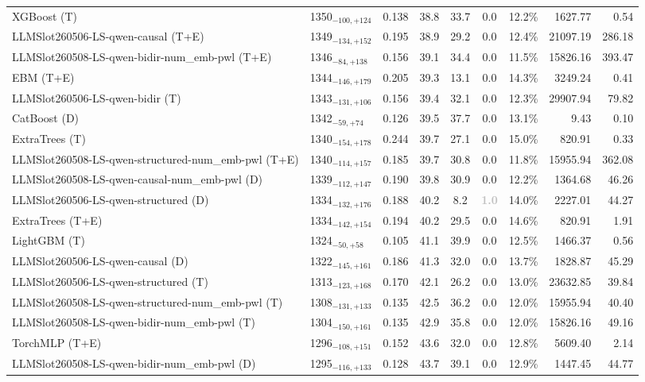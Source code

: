\begin{tabular}{llcccccrr}
XGBoost (T) & 1350${}_{-100,+124}$ & 0.138 & 38.8 & 33.7 & 0.0 & 12.2\% & 1627.77 & 0.54 \\
LLMSlot260506-LS-qwen-causal (T+E) & 1349${}_{-134,+152}$ & 0.195 & 38.9 & 29.2 & 0.0 & 12.4\% & 21097.19 & 286.18 \\
LLMSlot260508-LS-qwen-bidir-num_emb-pwl (T+E) & 1346${}_{-84,+138}$ & 0.156 & 39.1 & 34.4 & 0.0 & 11.5\% & 15826.16 & 393.47 \\
EBM (T+E) & 1344${}_{-146,+179}$ & 0.205 & 39.3 & 13.1 & 0.0 & 14.3\% & 3249.24 & 0.41 \\
LLMSlot260506-LS-qwen-bidir (T) & 1343${}_{-131,+106}$ & 0.156 & 39.4 & 32.1 & 0.0 & 12.3\% & 29907.94 & 79.82 \\
CatBoost (D) & 1342${}_{-59,+74}$ & 0.126 & 39.5 & 37.7 & 0.0 & 13.1\% & 9.43 & 0.10 \\
ExtraTrees (T) & 1340${}_{-154,+178}$ & 0.244 & 39.7 & 27.1 & 0.0 & 15.0\% & 820.91 & 0.33 \\
LLMSlot260508-LS-qwen-structured-num_emb-pwl (T+E) & 1340${}_{-114,+157}$ & 0.185 & 39.7 & 30.8 & 0.0 & 11.8\% & 15955.94 & 362.08 \\
LLMSlot260508-LS-qwen-causal-num_emb-pwl (D) & 1339${}_{-112,+147}$ & 0.190 & 39.8 & 30.9 & 0.0 & 12.2\% & 1364.68 & 46.26 \\
LLMSlot260506-LS-qwen-structured (D) & 1334${}_{-132,+176}$ & 0.188 & 40.2 & 8.2 & \textcolor{silver}{\textbf{1.0}} & 14.0\% & 2227.01 & 44.27 \\
ExtraTrees (T+E) & 1334${}_{-142,+154}$ & 0.194 & 40.2 & 29.5 & 0.0 & 14.6\% & 820.91 & 1.91 \\
LightGBM (T) & 1324${}_{-50,+58}$ & 0.105 & 41.1 & 39.9 & 0.0 & 12.5\% & 1466.37 & 0.56 \\
LLMSlot260506-LS-qwen-causal (D) & 1322${}_{-145,+161}$ & 0.186 & 41.3 & 32.0 & 0.0 & 13.7\% & 1828.87 & 45.29 \\
LLMSlot260506-LS-qwen-structured (T) & 1313${}_{-123,+168}$ & 0.170 & 42.1 & 26.2 & 0.0 & 13.0\% & 23632.85 & 39.84 \\
LLMSlot260508-LS-qwen-structured-num_emb-pwl (T) & 1308${}_{-131,+133}$ & 0.135 & 42.5 & 36.2 & 0.0 & 12.0\% & 15955.94 & 40.40 \\
LLMSlot260508-LS-qwen-bidir-num_emb-pwl (T) & 1304${}_{-150,+161}$ & 0.135 & 42.9 & 35.8 & 0.0 & 12.0\% & 15826.16 & 49.16 \\
TorchMLP (T+E) & 1296${}_{-108,+151}$ & 0.152 & 43.6 & 32.0 & 0.0 & 12.8\% & 5609.40 & 2.14 \\
LLMSlot260508-LS-qwen-bidir-num_emb-pwl (D) & 1295${}_{-116,+133}$ & 0.128 & 43.7 & 39.1 & 0.0 & 12.9\% & 1447.45 & 44.77 \\

\end{tabular}
